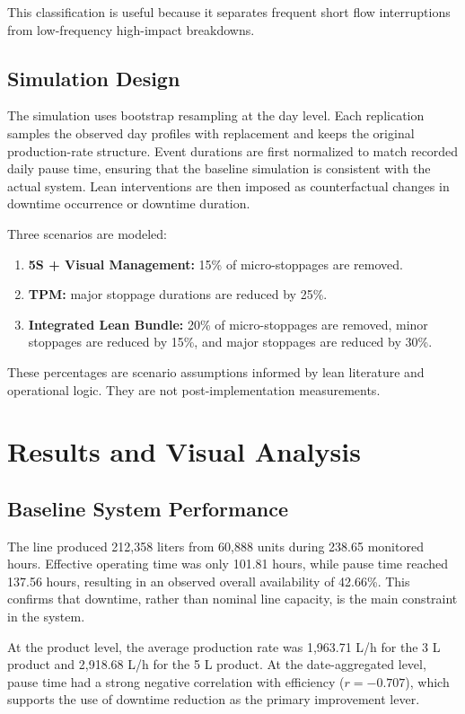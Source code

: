 \documentclass[journal]{IEEEtran}
\begin{document}
This classification is useful because it separates frequent short flow interruptions from low-frequency high-impact breakdowns.

\subsection{Simulation Design}
The simulation uses bootstrap resampling at the day level. Each replication samples the observed day profiles with replacement and keeps the original production-rate structure. Event durations are first normalized to match recorded daily pause time, ensuring that the baseline simulation is consistent with the actual system. Lean interventions are then imposed as counterfactual changes in downtime occurrence or downtime duration.

Three scenarios are modeled:
\begin{enumerate}
    \item \textbf{5S + Visual Management:} 15\% of micro-stoppages are removed.
    \item \textbf{TPM:} major stoppage durations are reduced by 25\%.
    \item \textbf{Integrated Lean Bundle:} 20\% of micro-stoppages are removed, minor stoppages are reduced by 15\%, and major stoppages are reduced by 30\%.
\end{enumerate}

These percentages are scenario assumptions informed by lean literature and operational logic. They are not post-implementation measurements.

\section{Results and Visual Analysis}
\subsection{Baseline System Performance}
The line produced 212,358 liters from 60,888 units during 238.65 monitored hours. Effective operating time was only 101.81 hours, while pause time reached 137.56 hours, resulting in an observed overall availability of 42.66\%. This confirms that downtime, rather than nominal line capacity, is the main constraint in the system.

At the product level, the average production rate was 1,963.71 L/h for the 3 L product and 2,918.68 L/h for the 5 L product. At the date-aggregated level, pause time had a strong negative correlation with efficiency ($r=-0.707$), which supports the use of downtime reduction as the primary improvement lever.
\end{document}
